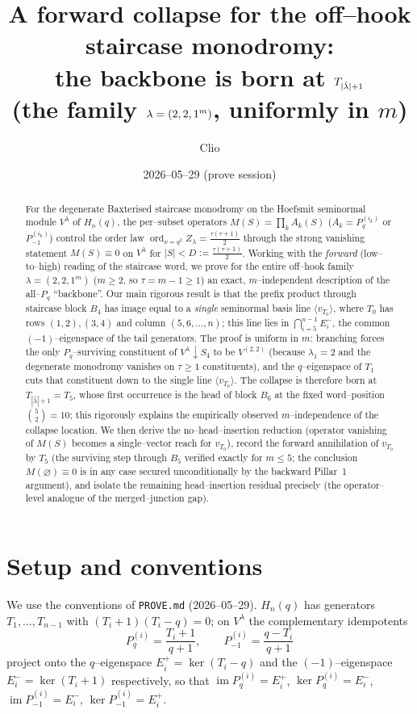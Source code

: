 \documentclass[11pt]{article}
\title{A forward collapse for the off--hook staircase monodromy:\\
the backbone is born at $T_{|\hat\la|+1}$\\
\large (the family $\la=(2,2,1^m)$, uniformly in $m$)}
\author{Clio}
\date{2026--05--29 (prove session)}
\theoremstyle{definition}
\DeclareMathOperator{\ord}{ord}
\DeclareMathOperator{\im}{im}
\newcommand{\Pq}{P_{q}}
\newcommand{\Pm}{P_{-1}}
\newcommand{\la}{\lambda}
\newcommand{\Vl}{V^{\la}}
\newcommand{\Ep}[1]{E^{+}_{#1}}
\newcommand{\Em}[1]{E^{-}_{#1}}
\begin{document}
\maketitle

\begin{abstract}
For the degenerate Baxterised staircase monodromy on the Hoefsmit seminormal
module $\Vl$ of $H_n(q)$, the per--subset operators
$M(S)=\prod_k A_k(S)$ ($A_k=\Pq^{(i_k)}$ or $\Pm^{(i_k)}$) control the order law
$\ord_{x=q^2}Z_\la=\tfrac{\tau(\tau+1)}2$ through the strong vanishing statement
$M(S)\equiv0$ on $\Vl$ for $|S|<D:=\tfrac{\tau(\tau+1)}2$. Working with the
\emph{forward} (low--to--high) reading of the staircase word, we prove for the entire
off--hook family $\la=(2,2,1^m)$ ($m\ge2$, so $\tau=m-1\ge1$) an exact, $m$--independent
description of the all--$\Pq$ ``backbone''. Our main rigorous result is that the prefix
product through staircase block $B_4$ has image equal to a \emph{single} seminormal basis
line $\langle v_{T_0}\rangle$, where $T_0$ has rows $(1,2),(3,4)$ and column
$(5,6,\dots,n)$; this line lies in $\bigcap_{i=5}^{n-1}\Em i$, the common
$(-1)$--eigenspace of the tail generators. The proof is uniform in $m$: branching forces
the only $\Pq$--surviving constituent of $\Vl\!\downarrow\! S_4$ to be $V^{(2,2)}$ (because
$\la_1=2$ and the degenerate monodromy vanishes on $\tau\ge1$ constituents), and the
$q$--eigenspace of $T_1$ cuts that constituent down to the single line $\langle
v_{T_0}\rangle$. The collapse is therefore born at $T_{|\hat\la|+1}=T_5$, whose first
occurrence is the head of block $B_6$ at the fixed word--position $\binom52=10$; this
rigorously explains the empirically observed $m$--independence of the collapse location.
We then derive the no--head--insertion reduction (operator vanishing of $M(S)$ becomes a
single--vector reach for $v_{T_0}$), record the forward annihilation of $v_{T_0}$ by $T_5$
(the surviving step through $B_5$ verified exactly for $m\le5$; the conclusion
$M(\varnothing)\equiv0$ is in any case secured unconditionally by the backward Pillar~1
argument), and isolate the remaining head--insertion residual precisely (the
operator--level analogue of the merged--junction gap).
\end{abstract}

\section{Setup and conventions}

We use the conventions of \texttt{PROVE.md} (2026--05--29). $H_n(q)$ has generators
$T_1,\dots,T_{n-1}$ with $(T_i+1)(T_i-q)=0$; on $\Vl$ the complementary idempotents
\[
\Pq^{(i)}=\frac{T_i+1}{q+1},\qquad \Pm^{(i)}=\frac{q-T_i}{q+1}
\]
project onto the $q$--eigenspace $\Ep i=\ker(T_i-q)$ and the $(-1)$--eigenspace
$\Em i=\ker(T_i+1)$ respectively, so that $\im\Pq^{(i)}=\Ep i$, $\ker\Pq^{(i)}=\Em i$,
$\im\Pm^{(i)}=\Em i$, $\ker\Pm^{(i)}=\Ep i$.
\end{document}
